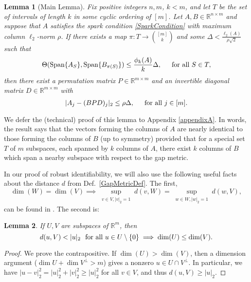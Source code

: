 \documentclass[journal, onecolumn]{IEEEtran}
\newtheorem{lemma}{Lemma}
\begin{document}
\begin{lemma}[Main Lemma]\label{MainLemma}
Fix positive integers $n, m$, $k < m$, and let $T$ be the set of intervals of length $k$ in some cyclic ordering of $[m]$. Let $A, B \in \mathbb{R}^{n \times m}$ and suppose that $A$ satisfies the spark condition \eqref{SparkCondition} with maximum column $\ell_2$-norm $\rho$.  If there exists a map $\pi: T \to {[m] \choose k}$ and some $\Delta < \frac{\ell_{2}(A)}{\rho \sqrt{2}}$ such that 
\begin{equation}\label{GapUpperBound}
\Theta(\text{\rm Span}\{A_{S}\}, \text{\rm Span}\{B_{\pi(S)}\}) \leq \frac{ \phi_k(A) }{k} \Delta, \indent \text{for all } S \in T,
\end{equation}
%
then there exist a permutation matrix $P \in \mathbb{R}^{m \times m}$ and an invertible diagonal matrix $D \in \mathbb{R}^{m \times m}$ with
\begin{align}
|A_j - (BPD)_j|_2 \leq \rho \Delta, \indent \text{for all } j \in [m].
\end{align}
\end{lemma}
We defer the (technical) proof of this lemma to Appendix \ref{appendixA}. In words, the result says that the vectors forming the columns of $A$ are nearly identical to those forming the columns of $B$ (up to symmetry) provided that for a special set $T$ of $m$ subspaces, each spanned by $k$ columns of $A$, there exist $k$ columns of $B$ which span a nearby subspace with respect to the gap metric.

In our proof of robust identifiability, we will also use the following useful facts about the distance $d$ from Def.~\ref{GapMetricDef}. The first, 
\begin{equation}\label{SubspaceMetricSameDim}
\dim(W) = \dim(V) \implies \sup_{\substack{v \in V, |v|_2 = 1}}  d(v,W)  = \sup_{\substack{w \in W, |w|_2 = 1}} d(w,V),
\end{equation}
can be found in \cite[Lemma 3.3]{Morris10}. The second is:
\begin{lemma}\label{MinDimLemma}
If $U, V$ are subspaces of $\mathbb{R}^{m}$, then
\begin{equation}\label{MinDim}
d(u,V) < |u|_2 \ \ \text{\rm for all } u \in U \setminus{\{0\}} \implies \dim(U) \leq \dim(V).
\end{equation}
\end{lemma}

\begin{proof}
We prove the contrapositive.  If $\dim(U) > \dim(V)$, then a dimension argument ($\dim U + \dim V^\perp > m$) gives a nonzero $u \in U \cap V^\perp$.  In particular, we have $|u - v|_2^2 = |u|_2^2 + |v|_2^2 \geq |u|_2^2$ for all $v \in V$, and thus $d(u,V) \geq |u|_2$.
\end{proof}
\end{document}
